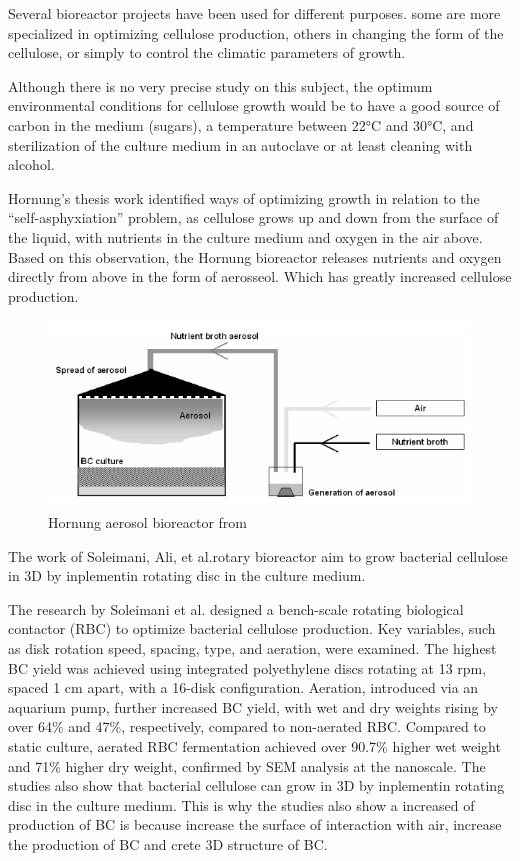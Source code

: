 Several bioreactor projects have been used for different purposes. some are more specialized in optimizing cellulose production, others in changing the form of the cellulose, or simply to control the climatic parameters of growth. 

Although there is no very precise study on this subject, the optimum environmental conditions for cellulose growth would be to have a good source of carbon in the medium \cite{ruka2012altering} (sugars), a temperature between 22°C and 30°C, and sterilization of the culture medium in an autoclave or at least cleaning with alcohol. 

Hornung's thesis\cite{hornung2010optimising} work identified ways of optimizing growth in relation to the “self-asphyxiation” problem, as cellulose grows up and down from the surface of the liquid, with nutrients in the culture medium and oxygen in the air above.
Based on this observation, the Hornung bioreactor releases nutrients and oxygen directly from above in the form of aerosseol. 
Which has greatly increased cellulose production. 

\begin{figure}[h]
    \centering
    \includegraphics{images/aerosol.png}
    \caption{Hornung aerosol bioreactor from \cite{hornung2010optimising}}
    \label{fig:aerosol}
\end{figure} 

The work of Soleimani, Ali, et al.rotary bioreactor aim to grow bacterial cellulose in 3D by inplementin rotating disc in the culture medium. 

The research by Soleimani et al.\cite{soleimani2021design} designed a bench-scale rotating biological contactor (RBC) to optimize bacterial cellulose production. Key variables, such as disk rotation speed, spacing, type, and aeration, were examined. The highest BC yield was achieved using integrated polyethylene discs rotating at 13 rpm, spaced 1 cm apart, with a 16-disk configuration. Aeration, introduced via an aquarium pump, further increased BC yield, with wet and dry weights rising by over 64\% and 47\%, respectively, compared to non-aerated RBC. Compared to static culture, aerated RBC fermentation achieved over 90.7\% higher wet weight and 71\% higher dry weight, confirmed by SEM analysis at the nanoscale.
The studies also show that bacterial cellulose can grow in 3D by inplementin rotating disc in the culture medium.
This is why the studies also show a increased of production of BC is because increase the surface of interaction with air, increase the production of BC and crete 3D structure of BC.

